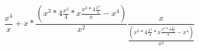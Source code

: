 \documentclass{article}
\begin{document}
\fontsize{8}{8pt}\selectfont
\begin{equation}
\frac{{x}^{4}}{x}+x*\frac{\left({x}^{3}*4\frac{{x}^{3}}{4}*x\frac{{x}^{3}*4\frac{{x}^{3}}{4}}{x}-{x}^{4}\right)}{{x}^{2}}\frac{x}{\frac{\left({x}^{3}*4\frac{{x}^{3}}{4}*x\frac{{x}^{3}*4\frac{{x}^{3}}{4}}{x}-{x}^{4}\right)}{{x}^{2}}}\end{equation}
\end{document}
